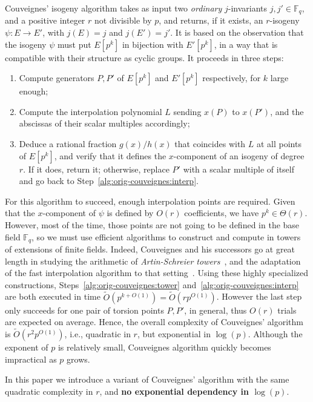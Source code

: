 \documentclass{lms}
\newcommand{\F}{\mathbb{F}}
\newcommand{\tildO}{\tilde{O}}
\begin{document}
Couveignes' isogeny algorithm takes as input two \emph{ordinary}
$j$-invariants $j,j'∈\F_q$, and a positive integer $r$ not
divisible by $p$, and returns, if it exists, an
$r$-isogeny $ψ:E\to E'$, with $j(E)=j$ and $j(E')=j'$. It is based on the observation that the
isogeny $ψ$ must put $E[p^k]$ in bijection with $E'[p^k]$, in a way
that is compatible with their structure as cyclic groups.
It proceeds in three steps:
\begin{enumerate}
\item\label{alg:orig-couveignes:tower} Compute generators $P,P'$ of
  $E[p^k]$ and $E'[p^k]$ respectively, for $k$ large enough;
\item\label{alg:orig-couveignes:interp} Compute the interpolation
  polynomial $L$ sending $x(P)$ to $x(P')$, and the abscissas of
  their scalar multiples accordingly;
\item\label{alg:orig-couveignes:rational} Deduce a rational fraction $g(x)/h(x)$
  that coincides with $L$ at all points of $E[p^k]$, and verify that
  it defines the $x$-component of an isogeny of degree $r$. If it
  does, return it; otherwise, replace $P'$ with a scalar multiple of
  itself and go back to Step~\ref{alg:orig-couveignes:interp}.
\end{enumerate}

For this algorithm to succeed, enough interpolation points are
required. Given that the $x$-component of $ψ$ is defined by $O(r)$
coefficients, we have $p^k∈\Theta(r)$. However, most of
the time, those points are not going to be defined in the base field
$\F_q$, so we must use efficient algorithms to construct and compute
in towers of extensions of finite fields. Indeed, Couveignes and his
successors go at great length in studying the arithmetic of
\emph{Artin-Schreier towers}~\cite{couveignes00,df+schost12}, and the
adaptation of the fast interpolation algorithm to that
setting~\cite{df10}.  Using these highly specialized constructions,
Steps~\ref{alg:orig-couveignes:tower}
and~\ref{alg:orig-couveignes:interp} are both executed in time
$\tildO(p^{k+O(1)})=\tildO(rp^{O(1)})$. However the last step only
succeeds for one pair of torsion points $P,P'$, in general, thus
$O(r)$ trials are expected on average.
Hence, the overall complexity of Couveignes' algorithm is
$\tildO(r^2p^{O(1)})$, i.e., quadratic in $r$, but exponential in
$\log(p)$. Although the exponent of $p$ is relatively small,
Couveignes algorithm quickly becomes impractical as $p$ grows.

In this paper we introduce a variant of Couveignes' algorithm with the
same quadratic complexity in $r$, and \textbf{no exponential
  dependency in $\log(p)$}.
\end{document}
